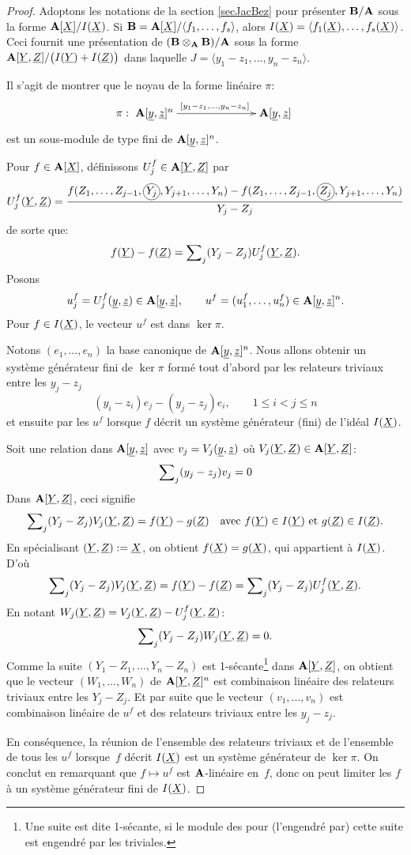 \documentclass[12pt,twoside,a4paper]{article}
\begin{document}
\begin {proof} %

Adoptons les notations de la section \ref{secJacBez} pour présenter
$\mathbf{B}/\mathbf{A}$ sous la forme $\mathbf{A}[{\underline{X}}]/I({\underline{X}})$. 
Si $\mathbf{B}=\mathbf{A}[{\underline{X}}]\!\left/\left\langle{f_1,\ldots,f_s}\right\rangle\right.\!$, alors $I({\underline{X}})=\left\langle{f_1({\underline{X}}),\dots,f_s({\underline{X}})}\right\rangle$.
Ceci fournit une
présentation de $(\mathbf{B}\otimes_{\mathbf{A}}\mathbf{B})/\mathbf{A}$ sous la forme $\mathbf{A}[{\underline{Y}},{\underline{Z}}]/\big(I({\underline{Y}}) +
I({\underline{Z}})\big)$ dans laquelle $J = \langle y_1-z_1, \dots,
y_n-z_n\rangle$.

Il s'agit de montrer que le noyau de
la forme linéaire $\pi$:
$$
\pi :
\xymatrix @C=2.5cm{\gA[\uy,\uz]^n \ar[r]^{[y_1-z_1, \dots, y_n-z_n]} & \gA[\uy,\uz]}
$$
est un sous-module de type fini de $\mathbf{A}[{\underline{y}},{\underline{z}}]^n$.

\medskip

Pour $f \in \mathbf{A}[{\underline{X}}]$, définissons $U^f_j \in \mathbf{A}[{\underline{Y}},{\underline{Z}}]$ par
$$
U^f_j(\uY,\uZ) =
\dfrac{f(Z_1,\dots, Z_{j-1}, \cercle{$Y_j$}, Y_{j+1},\dots,Y_n) -
f(Z_1,\dots,Z_{j-1},\cercle{$Z_j$},Y_{j+1},\dots,Y_n)}
{Y_j - Z_j}
$$
de sorte que:
$$
f({\underline{Y}}) - f({\underline{Z}}) = \sum\nolimits_j (Y_j-Z_j) U^f_j({\underline{Y}},{\underline{Z}}).
$$
Posons
$$
u_j^f = U^f_j({\underline{y}},{\underline{z}}) \in \mathbf{A}[{\underline{y}},{\underline{z}}],
\qquad
u^f = (u^f_1, \dots, u^f_n) \in \mathbf{A}[{\underline{y}},{\underline{z}}]^n.
$$
Pour $f \in I({\underline{X}})$, le vecteur $u^f$ est dans $\ker\pi$.

Notons $(e_1, \dots, e_n)$ la base canonique de $\mathbf{A}[{\underline{y}},{\underline{z}}]^n$.
Nous allons obtenir un système générateur fini de $\ker\pi$ formé tout d'abord par les relateurs triviaux entre les $y_j-z_j$
$$
(y_i-z_i)e_j - (y_j-z_j)e_i, \qquad
1 \le i < j \le n
$$
et ensuite par les  $u^f$ lorsque $f$ décrit un système générateur (fini) de l'idéal
$I({\underline{X}})$. 

\smallskip Soit une relation dans $\mathbf{A}[{\underline{y}},{\underline{z}}]$ avec $v_j = V_j({\underline{y}},{\underline{z}})$  où
$V_j({\underline{Y}},{\underline{Z}}) \in \mathbf{A}[{\underline{Y}},{\underline{Z}}]$:
$$
\sum\nolimits_j (y_j-z_j)v_j = 0
$$
Dans $\mathbf{A}[{\underline{Y}},{\underline{Z}}]$, ceci signifie
$$
\sum\nolimits_j (Y_j-Z_j)V_j({\underline{Y}},{\underline{Z}}) = f({\underline{Y}}) - g({\underline{Z}}) \quad
\text{avec $f({\underline{Y}}) \in I({\underline{Y}})$ et $g({\underline{Z}}) \in I({\underline{Z}})$}.
$$
En spécialisant $({\underline{Y}},{\underline{Z}}) := {\underline{X}}$, on obtient $f({\underline{X}}) = g({\underline{X}})$, qui appartient
à $I({\underline{X}})$. D'où
$$
\sum\nolimits_j (Y_j-Z_j)V_j({\underline{Y}},{\underline{Z}}) = f({\underline{Y}}) - f({\underline{Z}}) =
\sum\nolimits_j (Y_j-Z_j) U^f_j({\underline{Y}},{\underline{Z}}).
$$
En notant $W_j({\underline{Y}},{\underline{Z}}) = V_j({\underline{Y}},{\underline{Z}}) - U^f_j({\underline{Y}},{\underline{Z}})$:
$$
\sum\nolimits_j (Y_j-Z_j)W_j({\underline{Y}},{\underline{Z}}) = 0.
$$
Comme la suite $(Y_1-Z_1, \dots, Y_n-Z_n)$ est 1-sécante\footnote{Une suite est dite 1-sécante, si le module des \syzys pour (l'\id engendré par) cette suite est engendré par les \syzys triviales.} dans
$\mathbf{A}[{\underline{Y}},{\underline{Z}}]$, on obtient que le vecteur $(W_1, \dots, W_n)$
de $\mathbf{A}[{\underline{Y}},{\underline{Z}}]^n$ est combinaison linéaire des relateurs triviaux
entre les $Y_j-Z_j$. Et par suite que le vecteur $(v_1, \dots, v_n)$
est combinaison linéaire de $u^f$ et des relateurs triviaux
entre les $y_j-z_j$.

En conséquence, la réunion de l'ensemble des relateurs triviaux et de l'ensemble de tous les $u^f$ lorsque~$f$ décrit $I({\underline{X}})$ est un système générateur de $\ker\pi$.
On conclut en remarquant que $f \mapsto u^f$ est $\mathbf{A}$-linéaire en~$f$, donc on peut limiter les $f$ à un système générateur fini de $I({\underline{X}})$.
\end {proof}
\end{document}
